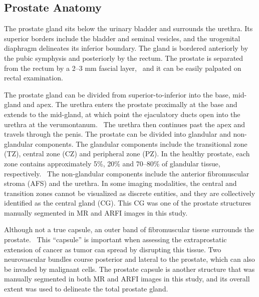 ﻿\subsection{Prostate Anatomy}
The prostate gland sits below the urinary bladder and surrounds the urethra.
Its superior borders include the bladder and seminal vesicles, and the
urogenital diaphragm delineates its inferior boundary. The gland is bordered
anteriorly by the pubic symphysis and posteriorly by the rectum.  The prostate
is separated from the rectum by a 2--3 mm fascial layer,~\cite{Jung2012} and it
can be easily palpated on rectal examination. 

The prostate gland can be divided from superior-to-inferior into the base,
mid-gland and apex. The urethra enters the prostate proximally at the base and
extends to the mid-gland, at which point the ejaculatory ducts open into the
urethra at the verumontanum.~\cite{Jung2012} The urethra then continues past
the apex and travels through the penis. The prostate can be divided into
glandular and non-glandular components.  The glandular components include the
transitional zone (TZ), central zone (CZ) and peripheral zone (PZ). In the
healthy prostate, each zone contains approximately 5\%, 20\% and 70--80\% of
glandular tissue, respectively.~\cite{Bonekamp2011} The non-glandular
components include the anterior fibromuscular stroma (AFS) and the urethra.  In
some imaging modalities, the central and transition zones cannot be visualized
as discrete entities, and they are collectively identified as the central gland
(CG).  This CG was one of the prostate structures manually segmented in MR and
ARFI images in this study.

Although not a true capsule, an outer band of fibromuscular tissue surrounds
the prostate.~\cite{Bonekamp2011} This ``capsule'' is important when assessing
the extraprostatic extension of cancer as tumor can spread by disrupting this
tissue. Two neurovascular bundles course posterior and lateral to the prostate,
which can also be invaded by malignant cells.  The prostate capsule is another
structure that was manually segmented in both MR and ARFI images in this study,
and its overall extent was used to delineate the total prostate gland.

